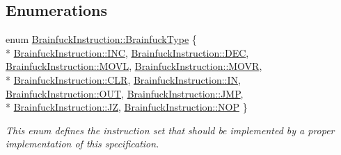 \subsection*{Enumerations}
\begin{DoxyCompactItemize}
\item 
enum \hyperlink{group__ast_ga536105595916938ef76e66bb1cdf7b2b}{Brainfuck\+Instruction\+::\+Brainfuck\+Type} \{ \\*
\hyperlink{group__ast_gga536105595916938ef76e66bb1cdf7b2bad430fd56820303a90e73ceb42ee688c3}{Brainfuck\+Instruction\+::\+I\+N\+C}, 
\hyperlink{group__ast_gga536105595916938ef76e66bb1cdf7b2ba79ab7bfb7d4524c305179cbb06b578a0}{Brainfuck\+Instruction\+::\+D\+E\+C}, 
\hyperlink{group__ast_gga536105595916938ef76e66bb1cdf7b2ba62cd33d0946e6731f9b0d5c27797d3a9}{Brainfuck\+Instruction\+::\+M\+O\+V\+L}, 
\hyperlink{group__ast_gga536105595916938ef76e66bb1cdf7b2ba7c1e82a95b7561d0dd74aab47eb36964}{Brainfuck\+Instruction\+::\+M\+O\+V\+R}, 
\\*
\hyperlink{group__ast_gga536105595916938ef76e66bb1cdf7b2bac1fb5c131100a52e04b9b2a0b000529d}{Brainfuck\+Instruction\+::\+C\+L\+R}, 
\hyperlink{group__ast_gga536105595916938ef76e66bb1cdf7b2baf95611cfc6305a83b391a18c19408d73}{Brainfuck\+Instruction\+::\+I\+N}, 
\hyperlink{group__ast_gga536105595916938ef76e66bb1cdf7b2bac2a4e58f27685769e6f5785073520725}{Brainfuck\+Instruction\+::\+O\+U\+T}, 
\hyperlink{group__ast_gga536105595916938ef76e66bb1cdf7b2ba5a4e446f0609b6e81c63cbaa2ad98e1d}{Brainfuck\+Instruction\+::\+J\+M\+P}, 
\\*
\hyperlink{group__ast_gga536105595916938ef76e66bb1cdf7b2ba46c8adfb23d44852d6e1a04d96cb1d66}{Brainfuck\+Instruction\+::\+J\+Z}, 
\hyperlink{group__ast_gga536105595916938ef76e66bb1cdf7b2ba02f03773b12443d2e4b834d140e5eb8f}{Brainfuck\+Instruction\+::\+N\+O\+P}
 \}
\begin{DoxyCompactList}\small\item\em This enum defines the instruction set that should be implemented by a proper implementation of this specification. \end{DoxyCompactList}\end{DoxyCompactItemize}
